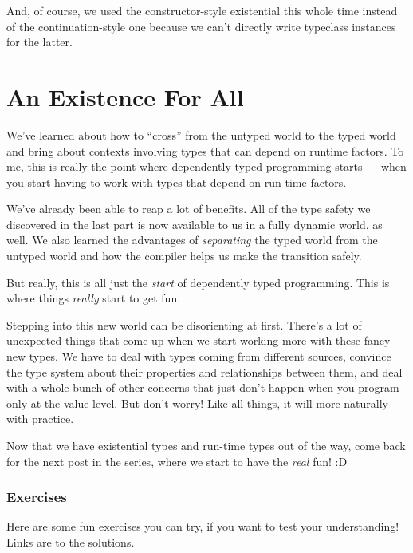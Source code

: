 \documentclass[]{article}
\begin{document}
And, of course, we used the constructor-style existential this whole time
instead of the continuation-style one because we can't directly write typeclass
instances for the latter.

\hypertarget{an-existence-for-all}{%
\section{An Existence For All}\label{an-existence-for-all}}

We've learned about how to ``cross'' from the untyped world to the typed world
and bring about contexts involving types that can depend on runtime factors. To
me, this is really the point where dependently typed programming starts --- when
you start having to work with types that depend on run-time factors.

We've already been able to reap a lot of benefits. All of the type safety we
discovered in the last part is now available to us in a fully dynamic world, as
well. We also learned the advantages of \emph{separating} the typed world from
the untyped world and how the compiler helps us make the transition safely.

But really, this is all just the \emph{start} of dependently typed programming.
This is where things \emph{really} start to get fun.

Stepping into this new world can be disorienting at first. There's a lot of
unexpected things that come up when we start working more with these fancy new
types. We have to deal with types coming from different sources, convince the
type system about their properties and relationships between them, and deal with
a whole bunch of other concerns that just don't happen when you program only at
the value level. But don't worry! Like all things, it will more naturally with
practice.

Now that we have existential types and run-time types out of the way, come back
for the next post in the series, where we start to have the \emph{real} fun! :D

\hypertarget{exercises}{%
\subsubsection{Exercises}\label{exercises}}

Here are some fun exercises you can try, if you want to test your understanding!
Links are to the solutions.
\end{document}
